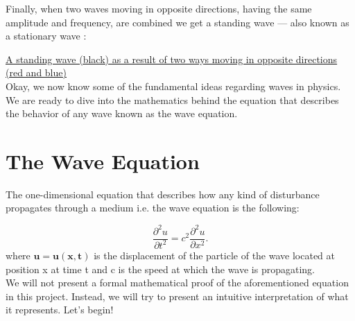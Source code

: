 \documentclass[oneside,hidelinks]{book}
\begin{document}
                Finally, when two waves moving in opposite directions, 
                having the same amplitude and frequency, 
                are combined we get a standing wave — also known as a stationary wave :

                \href{https://imgur.com/EEuwsY9}{\underline{A standing wave (black) as a result of two ways moving in opposite directions (red and blue)}}\\

                Okay, we now know some of the fundamental ideas 
                regarding waves in physics. We are ready to dive 
                into the mathematics behind the equation that 
                describes the behavior of any wave known as the 
                wave equation.



                \section{The Wave Equation}
                        The one-dimensional equation that describes 
                        how any kind of disturbance propagates through
                         a medium i.e. the wave equation is the following:

                        $${\displaystyle {\frac {\partial ^{2}u}{\partial t^{2}}}=c^{2}{\frac {\partial ^{2}u}{\partial x^{2}}}.}$$
                        where $\mathbf{u = u(x,t)}$ is the displacement of the
                        particle of the wave located at position x at time t and c 
                        is the speed at which the wave is propagating.\\


                        We will not present a formal mathematical proof of the
                        aforementioned equation in this project.
                        Instead, we will try to present an intuitive interpretation of what it represents. Let's begin!

 
\end{document}
